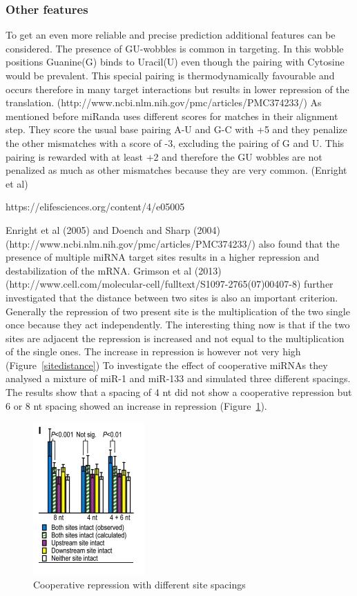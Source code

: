 \documentclass[12pt]{article}
\begin{document}
\subsubsection{Other features}
To get an even more reliable and precise prediction additional features can be considered. The presence of GU-wobbles is common in targeting. In this wobble positions Guanine(G) binds to Uracil(U) even though the pairing with Cytosine would be prevalent. This special pairing is thermodynamically favourable and occurs therefore in many target interactions but results in lower repression of the translation. (http://www.ncbi.nlm.nih.gov/pmc/articles/PMC374233/) As mentioned before miRanda uses different scores for matches in their alignment step. They score the usual base pairing A-U and G-C with +5 and they penalize the other mismatches with a score of -3, excluding the pairing of G and U. This pairing is rewarded with at least +2 and therefore the GU wobbles are not penalized as much as other mismatches because they are very common. (Enright et al)
 
https://elifesciences.org/content/4/e05005

Enright et al (2005) and Doench and Sharp (2004) (http://www.ncbi.nlm.nih.gov/pmc/articles/PMC374233/)  also found that the presence of multiple miRNA target sites results in a higher repression and destabilization of the mRNA. Grimson et al (2013) (http://www.cell.com/molecular-cell/fulltext/S1097-2765(07)00407-8) further investigated that the distance between two sites is also an important criterion. Generally the repression of two present site is the multiplication of the two single once because they act independently. The interesting thing now is that if the two sites are adjacent the repression is increased and not equal to the multiplication of the single ones. The increase in repression is however not very high (Figure~\ref{sitedistance}) To investigate the effect of cooperative miRNAs they analysed a mixture of miR-1 and miR-133 and simulated three different spacings. The results show that a spacing of 4 nt did not show a cooperative repression but 6 or 8 nt spacing showed an increase in repression (Figure~\ref{sitespacing}).\\

\begin{figure}
\centering
\includegraphics[scale=1.2]{results/sites_8nt.PNG}  
\caption{Cooperative repression with different site spacings}
\label{sitespacing}
\end{figure}
\end{document}
